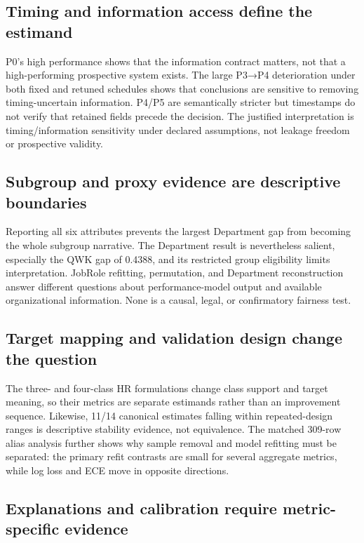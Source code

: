 \documentclass[information,article,submit,pdftex,moreauthors]{Definitions/mdpi}
\begin{document}
\subsection{Timing and information access define the estimand}

P0’s high performance shows that the information contract matters, not that a high-performing prospective system exists. The large P3→P4 deterioration under both fixed and retuned schedules shows that conclusions are sensitive to removing timing-uncertain information. P4/P5 are semantically stricter but timestamps do not verify that retained fields precede the decision. The justified interpretation is timing/information sensitivity under declared assumptions, not leakage freedom or prospective validity.

\subsection{Subgroup and proxy evidence are descriptive boundaries}

Reporting all six attributes prevents the largest Department gap from becoming the whole subgroup narrative. The Department result is nevertheless salient, especially the QWK gap of 0.4388, and its restricted group eligibility limits interpretation. JobRole refitting, permutation, and Department reconstruction answer different questions about performance-model output and available organizational information. None is a causal, legal, or confirmatory fairness test.

\subsection{Target mapping and validation design change the question}

The three- and four-class HR formulations change class support and target meaning, so their metrics are separate estimands rather than an improvement sequence. Likewise, 11/14 canonical estimates falling within repeated-design ranges is descriptive stability evidence, not equivalence. The matched 309-row alias analysis further shows why sample removal and model refitting must be separated: the primary refit contrasts are small for several aggregate metrics, while log loss and ECE move in opposite directions.

\subsection{Explanations and calibration require metric-specific evidence}
\end{document}
